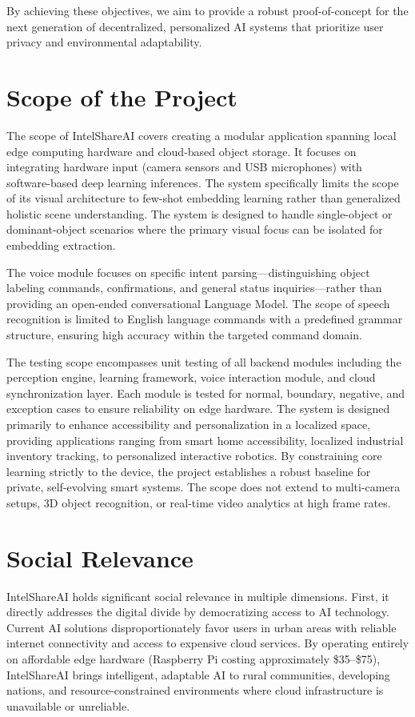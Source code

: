 \documentclass[12pt,a4paper]{report}
\begin{document}
By achieving these objectives, we aim to provide a robust proof-of-concept for the next generation of decentralized, personalized AI systems that prioritize user privacy and environmental adaptability.

\section{Scope of the Project}
The scope of IntelShareAI covers creating a modular application spanning local edge computing hardware and cloud-based object storage. It focuses on integrating hardware input (camera sensors and USB microphones) with software-based deep learning inferences. The system specifically limits the scope of its visual architecture to few-shot embedding learning rather than generalized holistic scene understanding. The system is designed to handle single-object or dominant-object scenarios where the primary visual focus can be isolated for embedding extraction.

The voice module focuses on specific intent parsing---distinguishing object labeling commands, confirmations, and general status inquiries---rather than providing an open-ended conversational Language Model. The scope of speech recognition is limited to English language commands with a predefined grammar structure, ensuring high accuracy within the targeted command domain.

The testing scope encompasses unit testing of all backend modules including the perception engine, learning framework, voice interaction module, and cloud synchronization layer. Each module is tested for normal, boundary, negative, and exception cases to ensure reliability on edge hardware. The system is designed primarily to enhance accessibility and personalization in a localized space, providing applications ranging from smart home accessibility, localized industrial inventory tracking, to personalized interactive robotics. By constraining core learning strictly to the device, the project establishes a robust baseline for private, self-evolving smart systems. The scope does not extend to multi-camera setups, 3D object recognition, or real-time video analytics at high frame rates.

\section{Social Relevance}
IntelShareAI holds significant social relevance in multiple dimensions. First, it directly addresses the digital divide by democratizing access to AI technology. Current AI solutions disproportionately favor users in urban areas with reliable internet connectivity and access to expensive cloud services. By operating entirely on affordable edge hardware (Raspberry Pi costing approximately \$35--\$75), IntelShareAI brings intelligent, adaptable AI to rural communities, developing nations, and resource-constrained environments where cloud infrastructure is unavailable or unreliable.
\end{document}
